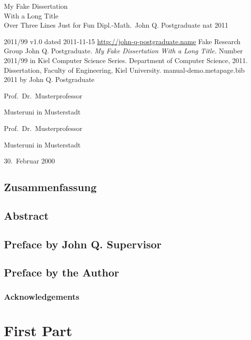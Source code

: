 \documentclass[10pt]{book}
\begin{document}
\frontmatter

\disstitlepage%
{My Fake Dissertation \\[.1em]
With a Long Title \\[.1em]
Over Three Lines}%
{Just for Fun}%
{Dipl.-Math.~John Q. Postgraduate}%
{nat}%
{2011}

\metapage%
{2011/99 v1.0 dated 2011-11-15}%
{\url{http://john-q-postgraduate.name}}%
{Fake Research Group}%
{John Q. Postgraduate.
\textit{My Fake Dissertation With a Long Title.}
Number 2011/99 in Kiel Computer Science Series.
Department of Computer Science, 2011.
Dissertation, Faculty of Engineering,
Kiel University.}%
{manual-demo.metapage.bib}%
{2011 by John Q. Postgraduate}%
{}



\dissreviewerpage%
{Prof.~Dr.~Musterprofessor \par Musteruni in Musterstadt}%
{Prof.~Dr.~Musterprofessor \par Musteruni in Musterstadt}%
{}%
{30.~Februar 2000}%

\chapter*{Zusammenfassung}
\blindtext
{}

\chapter*{Abstract}
\blindtext

\chapter{Preface by John Q. Supervisor} %
\blindtext

\chapter{Preface by the Author}
\blindtext
\section*{Acknowledgements}
\blindtext

\tableofcontents
\listoffigures
\listoftables

\mainmatter

\part{First Part}
\end{document}
